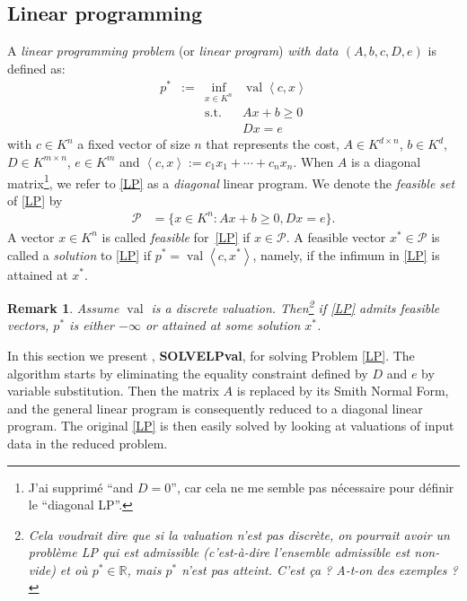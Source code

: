 \documentclass[a4paper,oneside,11pt]{article}
\newtheorem{remark}[theorem]{Remark}
\newcommand{\R}{\mathbb{R}} %
\newcommand{\PP}{\mathcal{P}}
\newcommand{\simone}[1]{{\color{blue} #1}} %
\DeclareMathOperator{\val}{val}
\begin{document}




\subsection{Linear programming}

A \emph{linear programming problem} (or \emph{linear program}) \emph{with data $(A,b,c,D,e)$} is defined
as:
\begin{equation}
  \tag{LP}\label{LP}
\begin{array}{rcll}
  p^* & := & \inf_{x \in K^n} & \val \left\langle c, x \right\rangle \\
  &    & \text{s.t.}         & A x + b \geq 0\\
  & & & D x = e
\end{array}
\end{equation}
with $c \in K^n$ a fixed vector of size $n$ that represents the cost,
$A \in K^{d \times n}$, $b \in K^d$, $D \in K^{m\times n}$, $e \in K^m$ 
and $\left\langle c, x \right\rangle := c_1 x_1+\cdots +c_n x_n$.
When $A$ is a diagonal matrix\footnote{\simone{J'ai supprimé ``and
$D=0$'', car cela ne me semble pas nécessaire pour définir le ``diagonal LP''.}},
we refer to \eqref{LP} as a \emph{diagonal} linear program.
We denote the \emph{feasible set} of \eqref{LP} by
\begin{equation*}
\begin{aligned}
  \PP  &= \{x \in K^n : Ax + b \geq 0, Dx = e\}.
\end{aligned}
\end{equation*}
A vector $x \in K^n$ is called \emph{feasible} for~\eqref{LP} if $x \in \PP$. A feasible vector $x^* \in \PP$ is called a \emph{solution} to \eqref{LP} if $p^* = \val\left\langle c,x^*\right\rangle$, namely, if the infimum in \eqref{LP} is attained at $x^*$.

\begin{remark}
  Assume $\val$ is a discrete valuation. Then\footnote{\simone{Cela voudrait dire que
    si la valuation n'est pas discrète, on pourrait avoir un problème LP qui est admissible
    (c'est-à-dire l'ensemble admissible est non-vide) et où $p^* \in \R$, mais $p^*$ n'est
  pas atteint. C'est ça ? A-t-on des exemples ?}} if \eqref{LP} admits feasible vectors,
  $p^*$ is either $-\infty$ or attained at some solution $x^*$.
\end{remark}

In this section we present , \textbf{SOLVELPval}, for solving Problem \eqref{LP}.
The algorithm starts by eliminating the equality constraint defined by $D$ and $e$
by variable substitution. Then the matrix $A$ is replaced by its Smith Normal Form,
and the general linear program is consequently reduced to a diagonal linear program.
The original \eqref{LP} is then easily solved by looking at valuations of input data
in the reduced problem.
\end{document}
